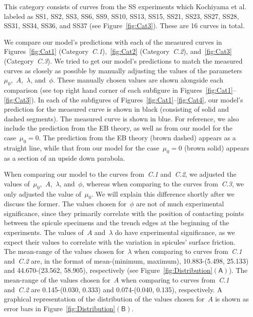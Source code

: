 \documentclass[preprint,10pt,times]{elsarticle}
\numberwithin{equation}{section}
\newcommand{\pr}[1]{\left( #1 \right)}
\newcommand{\subf}[1]{\pr{\textsf{#1}}}
\begin{document}
This category consists of curves from the SS experiments which Kochiyama
et al. labeled as SS1, SS2, SS3, SS6, SS9, SS10, SS13, SS15, SS21,
SS23, SS27, SS28, SS31, SS34, SS36, and SS37 (see Figure~\ref{fig:Cat3}).
These are 16 curves in total.

We compare our model's predictions with each of the measured curves
in Figures~\ref{fig:Cat1} (Category~\textit{C.1}),~\ref{fig:Cat2}
(Category~\textit{C.2}), and~\ref{fig:Cat3} (Category~\textit{C.3}).
We tried to get our model's predictions to match the measured curves
as closely as possible by manually adjusting the values of the parameters~$\mu_0$,~$A$,~$\lambda$,
and~$\phi$. These manually chosen values are shown alongside each
comparison (see top right hand corner of each subfigure in Figures~\ref{fig:Cat1}--\ref{fig:Cat3}).
In each of the subfigures of Figures~\ref{fig:Cat1}--\ref{fig:Cat4},
our model's prediction for the measured curve is shown in black (consisting
of solid and dashed segments). The measured curve is shown in blue.
For reference, we also include the prediction from the EB theory,
as well as from our model for the case~$\mu_0=0$. The prediction
from the EB theory (brown dashed) appears as a straight line, while
that from our model for the case~$\mu_0=0$ (brown solid) appears
as a section of an upside down parabola.

When comparing our model to the curves from~\textit{C.1} and~\textit{C.2},
we adjusted the values of~$\mu_0$,~$A$,~$\lambda$, and~$\phi$,
whereas when comparing to the curves from~\textit{C.3}, we only adjusted
the value of~$\mu_0$. We will explain this difference shortly after
we discuss the former. The values chosen for~$\phi$ are not of much
experimental significance, since they primarily correlate with the
position of contacting points between the spicule specimens and the
trench edges at the beginning of the experiments. The values of~$A$
and~$\lambda$ do have experimental significance, as we expect their
values to correlate with the variation in spicules' surface friction.
The mean-range of the values chosen for~$\lambda$ when comparing
to curves from~\textit{C.1} and~\textit{C.2} are, in the format
of mean-(minimum, maximum), 10.883-(5.498, 25.133) and 44.670-(23.562,
58.905), respectively (see Figure~\ref{fig:Distribution}$\subf{A}$).
The mean-range of the values chosen for~$A$ when comparing to curves
from~\textit{C.1} and~\textit{C.2} are 0.145-(0.030, 0.333) and
0.074-(0.040, 0.135), respectively. A graphical representation of
the distribution of the values chosen for~$A$ is shown as error
bars in Figure~\ref{fig:Distribution}$\subf{B}$.
\end{document}
